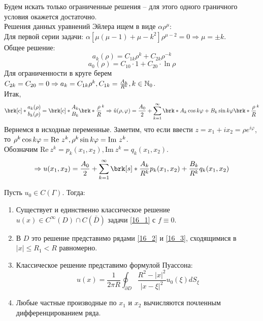Будем искать только ограниченные решения -- для этого одного граничного условия окажется достаточно.\\
Решения данных уравнений Эйлера ищем в виде $\alpha \rho^\mu$:\\
Для первой серии задачи: $\alpha[\mu(\mu-1)+\mu - k^2] \rho^{\mu-2} = 0 \Rightarrow \mu = \pm k$.\\
Общее решение:
$$ a_k(\rho) = C_{1k}\rho^k+C_{2k}\rho^{-k} $$
$$a_0(\rho) = C_{10} \cdot 1 + C_{20} \cdot \ln \rho$$
Для ограниченности в круге берем $C_{2k} = C_{20} = 0 \Rightarrow a_k = C_{1k} \rho^k, C_{1k} = \frac{A_k}{R^k}, k \in \mathbb{N}_0$.\\
Итак, 
\begin{equation}\label{16_2}
\brk[c]*{\begin{matrix} a_k(\rho)\\ b_k(\rho) \end{matrix}} = \brk[c]*{\begin{matrix} A_k\\ B_k \end{matrix}}\brk*{\frac{\rho}{R}}^k \Rightarrow \hat u(\rho, \varphi) = \frac{A_0}{2} + \sum_{k=1}^{\infty}\brk*{A_k \cos k \varphi + B_k \sin k \varphi} \brk*{\frac{\rho}{R}}^k  
\end{equation}
Вернемся в исходные переменные. Заметим, что если ввести $z = x_1+ix_2 = \rho e^{i \varphi}$, то $\rho^k \cos k \varphi = \mathrm{Re} \ z^k,\\ \rho^k \sin k \varphi = \mathrm{Im} \ z^k$.\\ Обозначим $\mathrm{Re} \ z^k = p_k(x_1,x_2), \mathrm{Im} \ z^k = q_k(x_1,x_2)$.
\begin{equation} \label{16_3}
\Rightarrow u(x_1,x_2) = \frac{A_0}{2}+ \sum_{k=1}^{\infty}\brk[s]*{\frac{A_k}{R^k} p_k(x_1,x_2) + \frac{B_k}{R^k} q_k(x_1,x_2)} 
\end{equation}
\begin{theorem}
Пусть $u_0 \in C(\Gamma)$. Тогда:
\begin{enumerate}
\item Существует и единственно классическое решение $u(x) \in C^\infty(D) \cap C(\bar D)$ задачи \ref{16_1} с $f \equiv 0$.
\item В $D$ это решение представимо рядами \ref{16_2} и \ref{16_3}, сходящимися в $|x| \leq R_1 < R$ равномерно.
\item Классическое решение представимо формулой Пуассона: \[u(x) = \frac{1}{2\pi R} \oint_{\partial D} \frac{R^2 - |x|^2}{|x- \xi|^2}u_0(\xi) dS_\xi\]
\item Любые частные производные по $x_1$ и $x_2$ вычисляются почленным дифференцированием ряда.
\end{enumerate}
\end{theorem}
